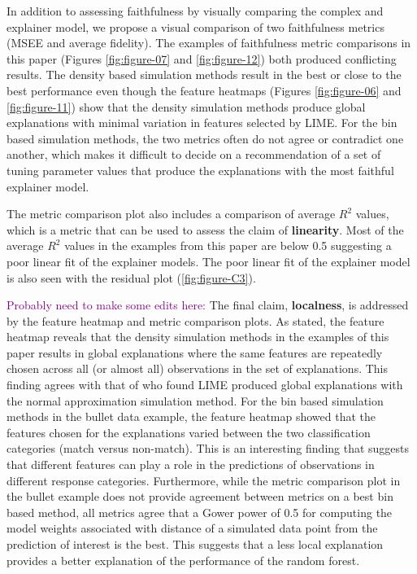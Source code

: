 \documentclass[AMS,STIX2COL]{WileyNJD-v2}\usepackage[]{graphicx}\usepackage[]{color}
\newcommand{\kgc}[1]{\textcolor{purple}{#1}}
\begin{document}
In addition to assessing faithfulness by visually comparing the complex and explainer model, we propose a visual comparison of two faithfulness metrics (MSEE and average fidelity). The examples of faithfulness metric comparisons in this paper (Figures \ref{fig:figure-07} and \ref{fig:figure-12}) both produced conflicting results. The density based simulation methods result in the best or close to the best performance even though the feature heatmaps (Figures \ref{fig:figure-06} and \ref{fig:figure-11}) show that the density simulation methods produce global explanations with minimal variation in features selected by LIME. For the bin based simulation methods, the two metrics often do not agree or contradict one another, which makes it difficult to decide on a recommendation of a set of tuning parameter values that produce the explanations with the most faithful explainer model.

The metric comparison plot also includes a comparison of average $R^2$ values, which is a metric that can be used to assess the claim of \textbf{linearity}. Most of the average $R^2$ values in the examples from this paper are below 0.5 suggesting a poor linear fit of the explainer models. The poor linear fit of the explainer model is also seen with the residual plot (\autoref{fig:figure-C3}).

\kgc{Probably need to make some edits here:} The final claim, \textbf{localness}, is addressed by the feature heatmap and metric comparison plots. As stated, the feature heatmap reveals that the density simulation methods in the examples of this paper results in global explanations where the same features are repeatedly chosen across all (or almost all) observations in the set of explanations. This finding agrees with that of \citep{laugel:2018} who found LIME produced global explanations with the normal approximation simulation method. For the bin based simulation methods in the bullet data example, the feature heatmap showed that the features chosen for the explanations varied between the two classification categories (match versus non-match). This is an interesting finding that suggests that different features can play a role in the predictions of observations in different response categories. Furthermore, while the metric comparison plot in the bullet example does not provide agreement between metrics on a best bin based method, all metrics agree that a Gower power of 0.5 for computing the model weights associated with distance of a simulated data point from the prediction of interest is the best. This suggests that a less local explanation provides a better explanation of the performance of the random forest.
\end{document}
